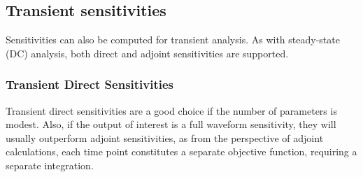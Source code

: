 \subsection{Transient sensitivities}
Sensitivities can also be computed for transient analysis.  As with
steady-state (DC) analysis, both direct and adjoint sensitivities are
supported.

\subsubsection{Transient Direct Sensitivities}
Transient direct sensitivities are a good choice if the number of
parameters is modest.  Also, if the output of interest is a full
waveform sensitivity, they will usually outperform adjoint
sensitivities, as from the perspective of adjoint calculations, each
time point constitutes a separate objective function, requiring a
separate integration.

